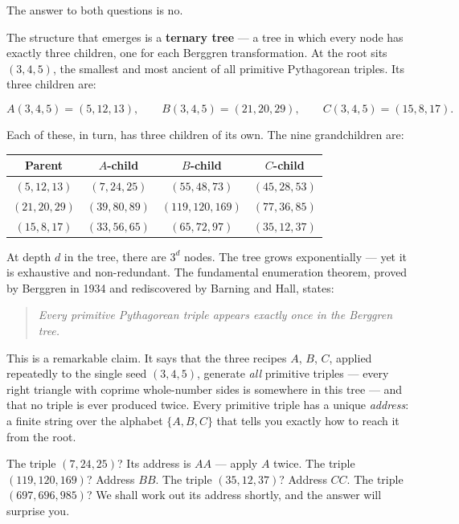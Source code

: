 The answer to both questions is no.

The structure that emerges is a \textbf{ternary tree} --- a tree in which every node has exactly three children, one for each Berggren transformation. At the root sits $(3, 4, 5)$, the smallest and most ancient of all primitive Pythagorean triples. Its three children are:

\[
A(3,4,5) = (5, 12, 13), \qquad B(3,4,5) = (21, 20, 29), \qquad C(3,4,5) = (15, 8, 17).
\]

Each of these, in turn, has three children of its own. The nine grandchildren are:

\begin{center}
\begin{tabular}{c c c c}
\toprule
Parent & $A$-child & $B$-child & $C$-child \\
\midrule
$(5, 12, 13)$ & $(7, 24, 25)$ & $(55, 48, 73)$ & $(45, 28, 53)$ \\
$(21, 20, 29)$ & $(39, 80, 89)$ & $(119, 120, 169)$ & $(77, 36, 85)$ \\
$(15, 8, 17)$ & $(33, 56, 65)$ & $(65, 72, 97)$ & $(35, 12, 37)$ \\
\bottomrule
\end{tabular}
\end{center}

At depth $d$ in the tree, there are $3^d$ nodes. The tree grows exponentially --- yet it is exhaustive and non-redundant. The fundamental enumeration theorem, proved by Berggren in 1934 and rediscovered by Barning and Hall, states:

\begin{quote}
\itshape \textit{Every primitive Pythagorean triple appears exactly once in the Berggren tree.}
\end{quote}

This is a remarkable claim. It says that the three recipes $A$, $B$, $C$, applied repeatedly to the single seed $(3, 4, 5)$, generate \textit{all} primitive triples --- every right triangle with coprime whole-number sides is somewhere in this tree --- and that no triple is ever produced twice. Every primitive triple has a unique \textit{address}: a finite string over the alphabet $\{A, B, C\}$ that tells you exactly how to reach it from the root.

The triple $(7, 24, 25)$? Its address is $AA$ --- apply $A$ twice. The triple $(119, 120, 169)$? Address $BB$. The triple $(35, 12, 37)$? Address $CC$. The triple $(697, 696, 985)$? We shall work out its address shortly, and the answer will surprise you.

